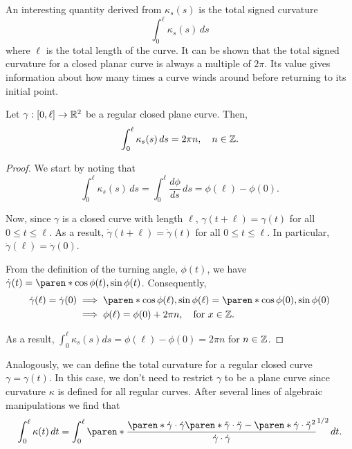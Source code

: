 \documentclass[11pt]{penrose}
\newcommand{\keyword}[1]{\textsf{#1}}
\begin{document}
An interesting quantity derived from $\kappa_s(s)$ is the \keyword{total signed curvature}
\begin{equation}
    \int_0^\ell \kappa_s (s) \,ds
\end{equation}
where $\ell$ is the total length of the curve. It can be shown that the total signed curvature for a closed planar curve is always a multiple of $2\pi$. Its value gives information about how many times a curve winds around before returning to its initial point.

\begin{nprop}
    Let $\gamma : [0, \ell] \to \mathbb{R}^2$ be a regular closed plane curve. Then,
    \begin{equation}
        \int_0^\ell \kappa_s (s) \,ds = 2\pi n,
        \quad n \in \mathbb{Z}.
    \end{equation}
\end{nprop}
\begin{proof}
    We start by noting that
    \begin{equation}
        \int_0^\ell \kappa_s (s) \,ds
        = \int_0^\ell \frac{d\phi}{ds} \,ds
        = \phi(\ell) - \phi(0).
    \end{equation}

    Now, since $\gamma$ is a closed curve with length $\ell$, $\gamma(t + \ell) = \gamma(t)$ for all $0 \leq t \leq \ell$. As a result, $\dot{\gamma}(t + \ell) = \dot{\gamma}(t)$ for all $0 \leq t \leq \ell$. In particular, $\dot{\gamma}(\ell) = \dot{\gamma}(0)$.

    From the definition of the turning angle, $\phi(t)$, we have $\dot{\gamma}(t) = \paren*{ \cos\phi(t), \sin\phi(t) }$. Consequently,
    \begin{align}
        \dot{\gamma}(\ell) = \dot{\gamma}(0)
        &\implies \paren*{ \cos\phi(\ell), \sin\phi(\ell) } = \paren*{ \cos\phi(0), \sin\phi(0) }\\
        &\implies \phi(\ell) = \phi(0) + 2\pi n, \quad\text{for } x \in \Z.
    \end{align}

    As a result, $\int_0^\ell \kappa_s (s) ds = \phi(\ell) - \phi(0) = 2\pi n$ for $n \in \mathbb{Z}$.
\end{proof}

Analogously, we can define the \keyword{total curvature} for a regular closed curve $\gamma = \gamma(t)$. In this case, we don't need to restrict $\gamma$ to be a plane curve since curvature $\kappa$ is defined for all regular curves. After several lines of algebraic manipulations we find that
\begin{equation}
    \int_0^\ell \kappa(t) \,dt
    = \int_{0}^{\ell} \paren*{ \frac{ \paren*{\dot{\gamma}\cdot\dot{\gamma}}\paren*{\ddot{\gamma}\cdot\ddot{\gamma}} - \paren*{\dot{\gamma}\cdot\ddot{\gamma}}^2 }{ \dot{\gamma}\cdot\dot{\gamma} } }^{1/2} \,dt.
\end{equation}
\end{document}
